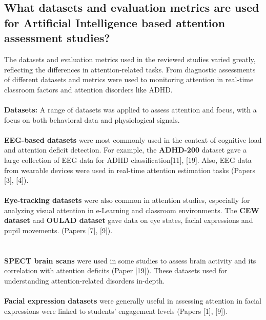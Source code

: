 \documentclass[12pt]{article}
\begin{document}
\subsection{What datasets and evaluation metrics are used for Artificial Intelligence based attention assessment studies?}
The datasets and evaluation metrics used in the reviewed studies varied greatly, reflecting the differences in attention-related tasks. From diagnostic assessments of different datasets and metrics were used to monitoring attention in real-time classroom factors and attention disorders like ADHD. \\ \\
\textbf{Datasets:} A range of datasets was applied to assess attention and focus, with a focus on both behavioral data and physiological signals. \\ \\
\textbullet \textbf{EEG-based datasets} were most commonly used in the context of cognitive load and attention deficit detection.  For example, the \textbf{ADHD-200} dataset gave a large collection of EEG data for ADHD classification[11], [19]. Also, EEG data from wearable devices were used in real-time attention estimation tasks (Papers [3], [4]).  \\ \\
\textbullet \textbf{Eye-tracking datasets} were also common in attention studies, especially for analyzing visual attention in e-Learning and classroom environments. The \textbf{CEW dataset} and \textbf{OULAD dataset} gave data on eye states, facial expressions and pupil movements. (Papers [7], [9]).  \\ \\ \\
\textbullet \textbf{SPECT brain scans} were used in some studies to assess brain activity and its correlation with attention deficits (Paper [19]). These datasets used for understanding attention-related disorders in-depth.  \\ \\
\textbullet \textbf{Facial expression datasets} were generally useful in assessing attention in facial expressions were linked to students' engagement levels (Papers [1], [9]).  \\ \\
\end{document}
